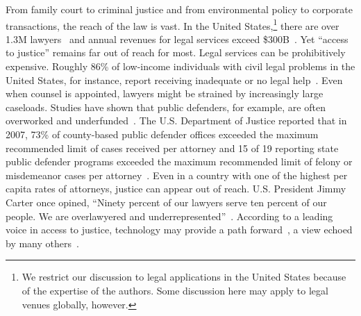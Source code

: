 From family court to criminal justice and from environmental policy to corporate transactions, the reach of the law is vast. In the United States,\footnote{We restrict our discussion to legal applications in the United States because of the expertise of the authors. Some discussion here may apply to legal venues globally, however.} there are over 1.3M lawyers~\citep{aba2021lawyer} and annual revenues for legal services exceed \$300B~\citep{marketline2020legalservices}.  Yet ``access to justice''  remains far out of reach for most. 
Legal services can be prohibitively expensive.
Roughly 86\% of low-income individuals with civil legal problems in the United States, for instance, report receiving inadequate or no legal help~\citep{lsc2017justice}. Even when counsel is appointed, lawyers might be strained by increasingly large caseloads. Studies have shown that public defenders, for example, are often overworked and underfunded~\citep{nrcc2009justice,nacdl2012national,aba2004gideon}. The U.S. Department of Justice reported that in 2007, 73\% of county-based public defender
offices exceeded the maximum recommended limit of cases
received per attorney and 15 of 19 reporting state public defender
programs exceeded the maximum recommended limit of felony or
misdemeanor cases per attorney~\citep{doj2010county,doj2010state}. 
Even in a country with one of the highest per capita rates of attorneys, justice can appear out of reach. U.S. President Jimmy Carter once opined, ``Ninety percent of our lawyers serve ten percent of our people. We are overlawyered and underrepresented''~\citep{carter1978speech}. According to a leading voice in access to justice, technology may provide a path forward~\citep{rhode2014access}, a view echoed by many  others~\citep{cabral2012using}.
 
